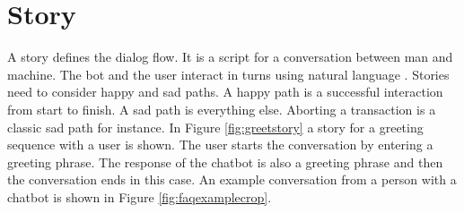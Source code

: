 




\section{Story}
A story defines the dialog flow. 
It is a script for a conversation between man and machine.
The bot and the user interact in turns using natural language \cite{evaluateChatbotsShawar2007, shawar2007chatbots, huang2007extracting, gregori2017evaluation}.
Stories need to consider happy and sad paths. 
A happy path is a successful interaction from start to finish.
A sad path is everything else. Aborting a transaction is a classic sad path for instance. 
In Figure \ref{fig:greetstory} a story for a greeting sequence with a user is shown. 
The user starts the conversation by entering a greeting phrase. 
The response of the chatbot is also a greeting phrase and then the conversation ends in this case. 
An example conversation from a person with a chatbot is shown in Figure \ref{fig:faqexamplecrop}.

